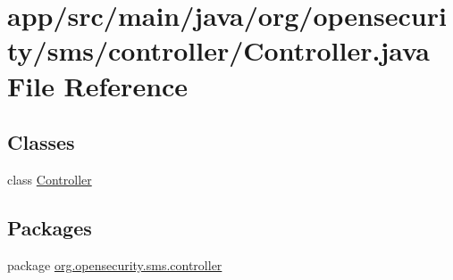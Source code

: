 \hypertarget{a00016}{\section{app/src/main/java/org/opensecurity/sms/controller/\+Controller.java File Reference}
\label{a00016}
}
\subsection*{Classes}
\begin{DoxyCompactItemize}
\item 
class \hyperlink{a00006}{Controller}
\end{DoxyCompactItemize}
\subsection*{Packages}
\begin{DoxyCompactItemize}
\item 
package \hyperlink{a00034}{org.\+opensecurity.\+sms.\+controller}
\end{DoxyCompactItemize}
